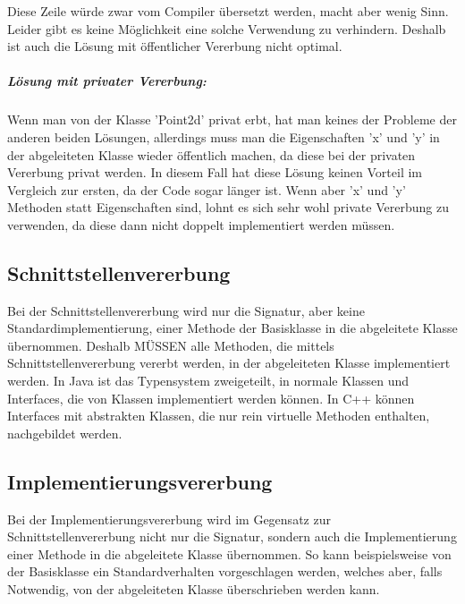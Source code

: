 			\UseRawInputEncoding{}
			Diese Zeile würde zwar vom Compiler übersetzt werden, macht aber wenig Sinn. Leider gibt es keine Möglichkeit eine
			solche Verwendung zu verhindern. Deshalb ist auch die Lösung mit öffentlicher Vererbung nicht optimal.
			
			\subparagraph*{Lösung mit privater Vererbung:}
			\UseRawInputEncoding{}
			Wenn man von der Klasse 'Point2d' privat erbt, hat man keines der Probleme der anderen beiden Lösungen,
			allerdings muss man die Eigenschaften 'x' und 'y' in der abgeleiteten Klasse wieder öffentlich machen, da diese bei
			der privaten Vererbung privat werden. In diesem Fall hat diese Lösung keinen Vorteil im Vergleich zur ersten, da
			der Code sogar länger ist. Wenn aber 'x' und 'y' Methoden statt Eigenschaften sind, lohnt es sich sehr wohl private
			Vererbung zu verwenden, da diese dann nicht doppelt implementiert werden müssen.
			
	
	\subsection{Schnittstellenvererbung}
		Bei der Schnittstellenvererbung wird nur die Signatur, aber keine Standardimplementierung, einer Methode der
		Basisklasse	in die abgeleitete Klasse übernommen. Deshalb MÜSSEN alle Methoden, die mittels Schnittstellenvererbung
		vererbt werden, in der abgeleiteten Klasse implementiert werden. In Java ist das Typensystem zweigeteilt, in normale
		Klassen und Interfaces, die von Klassen implementiert werden können. In C++ können Interfaces mit abstrakten Klassen,
		die nur rein virtuelle Methoden enthalten, nachgebildet werden.
		
	\subsection{Implementierungsvererbung}
		Bei der Implementierungsvererbung wird im Gegensatz zur Schnittstellenvererbung nicht nur die Signatur, sondern auch
		die Implementierung einer Methode in die abgeleitete Klasse übernommen. So kann beispielsweise von der Basisklasse ein
		Standardverhalten vorgeschlagen werden, welches aber, falls Notwendig, von der abgeleiteten Klasse überschrieben werden
		kann.
		
